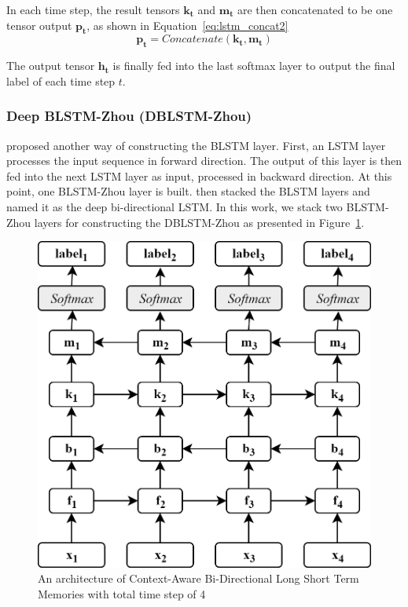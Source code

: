 In each time step, the result tensors $\mathbf{k_{t}}$ and $\mathbf{m_{t}}$ are then concatenated to be one tensor output $\mathbf{p_{t}}$, as shown in Equation~\ref{eq:lstm_concat2}
\begin{equation}
\label{eq:lstm_concat2}
\mathbf{p_{t}} = Concatenate(\mathbf{k_{t}}, \mathbf{m_{t}})
\end{equation}

The output tensor $\mathbf{h_{t}}$ is finally fed into the last softmax layer to output the final label of each time step $t$.

\subsubsection{Deep BLSTM-Zhou (DBLSTM-Zhou)}
\cite{zhou2015end} proposed another way of constructing the BLSTM layer. First, an LSTM layer processes the input sequence in forward direction. The output of this layer is then fed into the next LSTM layer as input, processed in backward direction. At this point, one BLSTM-Zhou layer is built. \cite{zhou2015end} then stacked the BLSTM layers and named it as the deep bi-directional LSTM. In this work, we stack two BLSTM-Zhou layers for constructing the DBLSTM-Zhou as presented in Figure~\ref{fig:dblstmzhou}.

\begin{figure}
	\centering
	\includegraphics[width=0.75\linewidth]{images/dblstmzhou}
	\caption{An architecture of Context-Aware Bi-Directional Long Short Term Memories with total time step of 4}
	\label{fig:dblstmzhou}
\end{figure}

